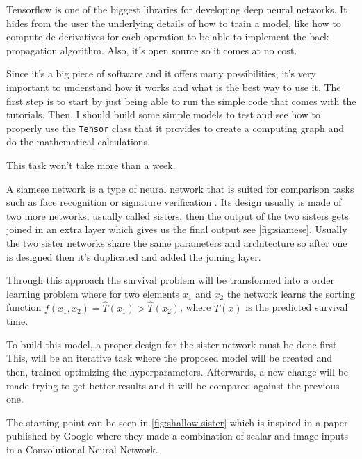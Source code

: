 
Tensorflow\cite{neural:tensorflow} is one of the biggest libraries for developing deep neural 
networks. It hides from the user the underlying details of how to train a model, like how to 
compute de derivatives for each operation to be able to implement the back propagation 
algorithm. Also, it's open source so it comes at no cost.

Since it's a big piece of software and it offers many possibilities, it's very important to 
understand how it works and what is the best way to use it. The first step is to start by 
just being able to run the simple code that comes with the tutorials. Then, I should build
some simple models to test and see how to properly use the \texttt{Tensor} class that it
provides to create a computing graph and do the mathematical calculations.

This task won't take more than a week.


A siamese network is a type of neural network that is suited for comparison tasks such as 
face recognition or signature verification \cite{neural:siamese}.
Its design usually is made of two more networks, usually called sisters, then the output
of the two sisters gets joined in an extra layer which gives us the final output 
see \autoref{fig:siamese}. Usually the two sister networks share the same parameters and
architecture so after one is designed then it's duplicated and added the joining layer.

Through this approach the survival problem will be transformed into a order learning problem
where for two elements \( x_1 \) and \( x_2 \) the network learns the sorting function
\( f(x_1, x_2) = \hat{T}(x_1) > \hat{T}(x_2) \), where \( \hat{T}(x) \) is the predicted 
survival time.

To build this model, a proper design for the sister network must be done first. This, will be
an iterative task where the proposed model will be created and then, trained optimizing
the hyperparameters. Afterwards, a new change will be made trying to get better results and
it will be compared against the previous one. 

The starting point can be seen in \autoref{fig:shallow-sister} which is inspired in a paper
\cite{neural:hand-eye-coordination} published by Google where they made a combination of 
scalar and image inputs in a Convolutional Neural Network.

